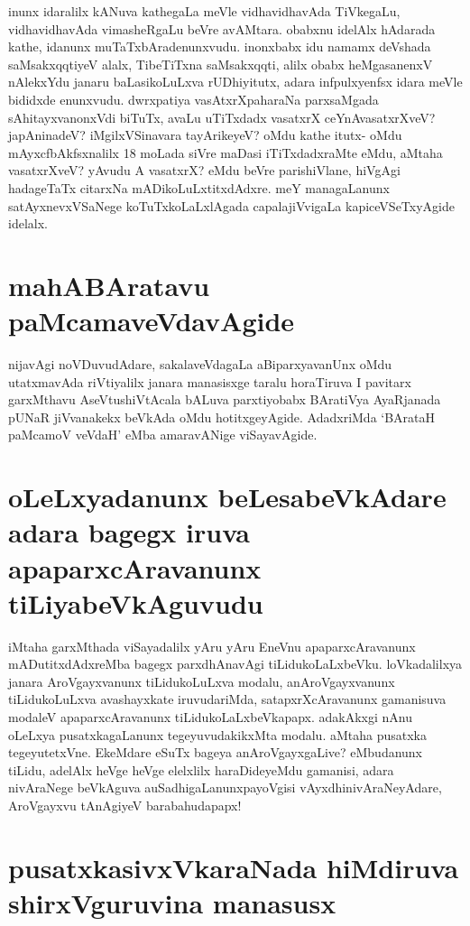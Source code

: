 inunx idaralilx kANuva kathegaLa meVle vidhavidhavAda TiVkegaLu, vidhavidhavAda vimasheRgaLu beVre avAMtara. obabxnu idelAlx hAdarada kathe, idanunx muTaTxbAradenunxvudu. inonxbabx idu namamx deVshada saMsakxqqtiyeV alalx, TibeTiTxna saMsakxqqti, alilx obabx heMgasanenxV nAlekxYdu janaru baLasikoLuLxva rUDhiyitutx, adara infpulxyenfsx idara meVle bididxde enunxvudu. dwrxpatiya vasAtxrXpaharaNa parxsaMgada sAhitayxvanonxVdi biTuTx, avaLu uTiTxdadx vasatxrX ceYnAvasatxrXveV? japAninadeV? iMgilxVSinavara tayArikeyeV? oMdu kathe itutx- oMdu mAyxcfbAkfsxnalilx 18 moLada siVre maDasi iTiTxdadxraMte eMdu, aMtaha vasatxrXveV? yAvudu A vasatxrX? eMdu beVre parishiVlane, hiVgAgi hadageTaTx citarxNa mADikoLuLxtitxdAdxre. meY managaLanunx satAyxnevxVSaNege koTuTxkoLaLxlAgada capalajiVvigaLa kapiceVSeTxyAgide idelalx.

\section*{mahABAratavu paMcamaveVdavAgide}

nijavAgi noVDuvudAdare, sakalaveVdagaLa aBiparxyavanUnx oMdu utatxmavAda riVtiyalilx janara manasisxge taralu horaTiruva I pavitarx garxMthavu AseVtushiVtAcala bALuva parxtiyobabx BAratiVya AyaRjanada pUNaR jiVvanakekx beVkAda oMdu hotitxgeyAgide. AdadxriMda `BArataH paMcamoV veVdaH'\label{122} eMba amaravANige viSayavAgide.

\section*{oLeLxyadanunx beLesabeVkAdare adara bagegx iruva apaparxcAravanunx tiLiyabeVkAguvudu}

iMtaha garxMthada viSayadalilx yAru yAru EneVnu apaparxcAravanunx mADutitxdAdxreMba bagegx parxdhAnavAgi tiLidukoLaLxbeVku. loVkadalilxya janara AroVgayxvanunx tiLidukoLuLxva modalu, anAroVgayxvanunx tiLidukoLuLxva avashayxkate iruvudariMda, satapxrXcAravanunx gamanisuva modaleV apaparxcAravanunx tiLidukoLaLxbeVkapapx. adakAkxgi nAnu oLeLxya pusatxkagaLanunx tegeyuvudakikxMta modalu. aMtaha pusatxka tegeyutetxVne. EkeMdare eSuTx bageya anAroVgayxgaLive? eMbudanunx tiLidu, adelAlx heVge heVge elelxlilx haraDideyeMdu gamanisi, adara nivAraNege beVkAguva auSadhigaLanunxpayoVgisi vAyxdhinivAraNeyAdare, AroVgayxvu tAnAgiyeV barabahudapapx!

\section*{pusatxkasivxVkaraNada hiMdiruva shirxVguruvina manasusx}

